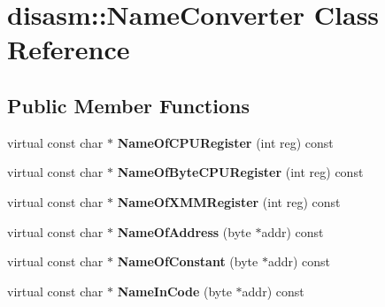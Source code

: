 \hypertarget{classdisasm_1_1_name_converter}{}\section{disasm\+:\+:Name\+Converter Class Reference}
\label{classdisasm_1_1_name_converter}
\subsection*{Public Member Functions}
\begin{DoxyCompactItemize}
\item 
virtual const char $\ast$ {\bfseries Name\+Of\+C\+P\+U\+Register} (int reg) const \hypertarget{classdisasm_1_1_name_converter_a3fc19f588af734134e834552d784a199}{}\label{classdisasm_1_1_name_converter_a3fc19f588af734134e834552d784a199}

\item 
virtual const char $\ast$ {\bfseries Name\+Of\+Byte\+C\+P\+U\+Register} (int reg) const \hypertarget{classdisasm_1_1_name_converter_af247198c0ee8b74827b7890f2169a79e}{}\label{classdisasm_1_1_name_converter_af247198c0ee8b74827b7890f2169a79e}

\item 
virtual const char $\ast$ {\bfseries Name\+Of\+X\+M\+M\+Register} (int reg) const \hypertarget{classdisasm_1_1_name_converter_a0415862f7e0bb0521db4ab87a1d95f82}{}\label{classdisasm_1_1_name_converter_a0415862f7e0bb0521db4ab87a1d95f82}

\item 
virtual const char $\ast$ {\bfseries Name\+Of\+Address} (byte $\ast$addr) const \hypertarget{classdisasm_1_1_name_converter_afb0e08d2922c58819a1556fee4c65f62}{}\label{classdisasm_1_1_name_converter_afb0e08d2922c58819a1556fee4c65f62}

\item 
virtual const char $\ast$ {\bfseries Name\+Of\+Constant} (byte $\ast$addr) const \hypertarget{classdisasm_1_1_name_converter_ae948c7e902b984ca7f25d12d4fb84edf}{}\label{classdisasm_1_1_name_converter_ae948c7e902b984ca7f25d12d4fb84edf}

\item 
virtual const char $\ast$ {\bfseries Name\+In\+Code} (byte $\ast$addr) const \hypertarget{classdisasm_1_1_name_converter_a73abd2795d841ff0eaa4149a787876e1}{}\label{classdisasm_1_1_name_converter_a73abd2795d841ff0eaa4149a787876e1}

\end{DoxyCompactItemize}
